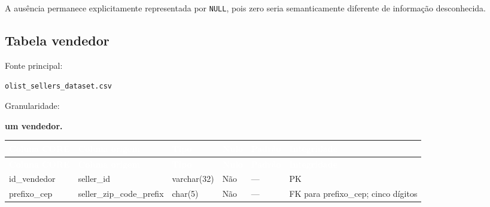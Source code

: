\documentclass[12pt,a4paper]{article}
\begin{document}
{	A ausência permanece explicitamente representada por \texttt{NULL},
	pois zero seria semanticamente diferente de informação desconhecida.
	
	\subsection{Tabela vendedor}
	
	Fonte principal:
	
	\texttt{olist\_sellers\_dataset.csv}
	
	Granularidade:
	
	\textbf{um vendedor.}
	

		
		{\small
			\renewcommand{\arraystretch}{1.50}
			
			\begin{longtable}{
					|>{\raggedright\arraybackslash}p{2.5cm}|
					>{\raggedright\arraybackslash}p{3.8cm}|
					>{\raggedright\arraybackslash}p{2cm}|
					>{\centering\arraybackslash}p{1cm}|
					>{\raggedright\arraybackslash}p{1.2cm}|
					>{\raggedright\arraybackslash}p{2.8cm}|
				}
				
				\hline
				\rowcolor{AzulCorporativo}
				
				\textcolor{white}{\textbf{Coluna CORE}} &
				\textcolor{white}{\textbf{Coluna origem}} &
				\textcolor{white}{\textbf{Tipo}} &
				\textcolor{white}{\textbf{Nulo}} &
				\textcolor{white}{\textbf{Padrão}} &
				\textcolor{white}{\textbf{Integridade}}
				\\ \hline
				
				\endfirsthead
				
				\hline
				\rowcolor{AzulCorporativo}
				
				\textcolor{white}{\textbf{Coluna CORE}} &
				\textcolor{white}{\textbf{Coluna origem}} &
				\textcolor{white}{\textbf{Tipo}} &
				\textcolor{white}{\textbf{Nulo}} &
				\textcolor{white}{\textbf{Padrão}} &
				\textcolor{white}{\textbf{Integridade}}
				\\ \hline
				
				\endhead
				
				id\_vendedor
				&
				seller\_id
				&
				varchar(32)
				&
				Não
				&
				---
				&
				PK
				\\ \hline
				
				prefixo\_cep
				&
				seller\_zip\_code\_prefix
				&
				char(5)
				&
				Não
				&
				---
				&
				FK para prefixo\_cep; cinco dígitos
				\\ \hline
				

\end{longtable}}}
\end{document}
